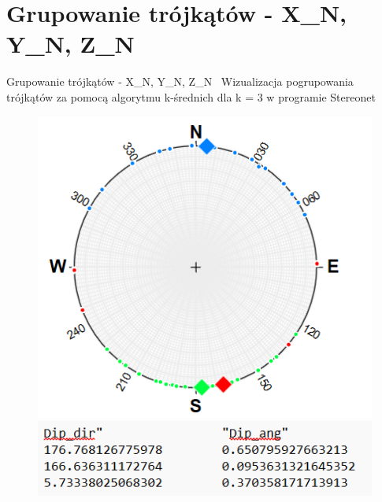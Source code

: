 \documentclass{beamer}
\begin{document}
\section{Grupowanie trójkątów - X\_N, Y\_N, Z\_N}
\begin{frame}{Grupowanie trójkątów - X\_N, Y\_N, Z\_N}
	\centering
	\ Wizualizacja pogrupowania trójkątów za pomocą algorytmu k-średnich dla k = 3 w programie Stereonet

	\begin{figure}
		\includegraphics[scale=0.5]{grupowanie_N.png}
	\includegraphics[scale=0.5]{X_Dsr.png}
	\end{figure}
\end{frame}
\end{document}
